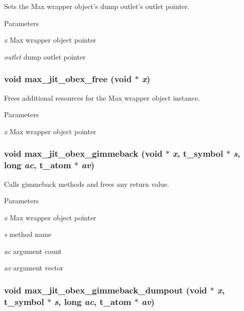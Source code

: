 Sets the Max wrapper object's dump outlet's outlet pointer. 
\begin{DoxyParams}{Parameters}
\item[{\em x}]Max wrapper object pointer \item[{\em outlet}]dump outlet pointer \end{DoxyParams}
\hypertarget{group__maxwrapmod_gabcf9c466a6baa22994a66e30b54e7dd6}{
\subsubsection[{max\_\-jit\_\-obex\_\-free}]{\setlength{\rightskip}{0pt plus 5cm}void max\_\-jit\_\-obex\_\-free (void $\ast$ {\em x})}}
\label{group__maxwrapmod_gabcf9c466a6baa22994a66e30b54e7dd6}


Frees additional resources for the Max wrapper object instance. 
\begin{DoxyParams}{Parameters}
\item[{\em x}]Max wrapper object pointer \end{DoxyParams}
\hypertarget{group__maxwrapmod_gabebaedc41e3bfef6f84d3752f619d045}{
\subsubsection[{max\_\-jit\_\-obex\_\-gimmeback}]{\setlength{\rightskip}{0pt plus 5cm}void max\_\-jit\_\-obex\_\-gimmeback (void $\ast$ {\em x}, \/  {\bf t\_\-symbol} $\ast$ {\em s}, \/  long {\em ac}, \/  {\bf t\_\-atom} $\ast$ {\em av})}}
\label{group__maxwrapmod_gabebaedc41e3bfef6f84d3752f619d045}


Calls gimmeback methods and frees any return value. 
\begin{DoxyParams}{Parameters}
\item[{\em x}]Max wrapper object pointer \item[{\em s}]method name \item[{\em ac}]argument count \item[{\em av}]argument vector \end{DoxyParams}
\hypertarget{group__maxwrapmod_ga9afabd186c3db8a6b4689eae00171bcd}{
\subsubsection[{max\_\-jit\_\-obex\_\-gimmeback\_\-dumpout}]{\setlength{\rightskip}{0pt plus 5cm}void max\_\-jit\_\-obex\_\-gimmeback\_\-dumpout (void $\ast$ {\em x}, \/  {\bf t\_\-symbol} $\ast$ {\em s}, \/  long {\em ac}, \/  {\bf t\_\-atom} $\ast$ {\em av})}}
\label{group__maxwrapmod_ga9afabd186c3db8a6b4689eae00171bcd}


